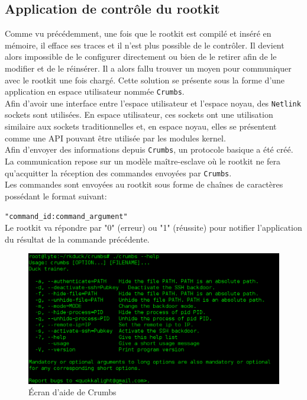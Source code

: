 \documentclass[12pt]{article}
\begin{document}
    \subsection{Application de contrôle du rootkit}
    \label{sec:crumb}

        Comme vu précédemment, une fois que le rootkit est compilé et inséré en mémoire, il efface ses traces et il n'est plus possible de le contrôler. Il devient alors impossible de le configurer directement ou bien de le retirer afin de le modifier et de le réinsérer. Il a alors fallu trouver un moyen pour communiquer avec le rootkit une fois chargé. Cette solution se présente sous la forme d'une application en espace utilisateur nommée \texttt{Crumbs}. \\

        Afin d'avoir une interface entre l'espace utilisateur et l'espace noyau, des \texttt{Netlink} sockets sont utilisées. En espace utilisateur, ces sockets ont une utilisation similaire aux sockets traditionnelles et, en espace noyau, elles se présentent comme une API pouvant être utilisée par les modules kernel. \\

        Afin d'envoyer des informations depuis \texttt{Crumbs}, un protocole basique a été créé. La communication repose sur un modèle maître-esclave où le rootkit ne fera qu'acquitter la réception des commandes envoyées par \texttt{Crumbs}. \\
        Les commandes sont envoyées au rootkit sous forme de chaînes de caractères possédant le format suivant:

        \texttt{"command\_id:command\_argument"}\\
        Le rootkit va répondre par "0" (erreur) ou "1" (réussite) pour notifier l'application du résultat de la commande précédente.

        \begin{figure}[H] 
        \begin{center}
        \includegraphics[scale=0.5]{./img/crumbs-help.png}

        \caption[dsfsdf]{Écran d'aide de Crumbs}
        \label{figure:5}
        \end{center}
        \end{figure}
\end{document}
